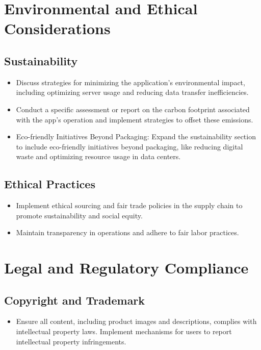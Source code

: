 \documentclass[11pt]{article}
\begin{document}
	\section*{Environmental and Ethical Considerations}
	
	\subsection*{Sustainability}
	\begin{itemize}
		\item Discuss strategies for minimizing the application's environmental impact, including optimizing server usage and reducing data transfer inefficiencies.
		\item Conduct a specific assessment or report on the carbon footprint associated with the app's operation and implement strategies to offset these emissions.
		\item Eco-friendly Initiatives Beyond Packaging: Expand the sustainability section to include eco-friendly initiatives beyond packaging, like reducing digital waste and optimizing resource usage in data centers.
	\end{itemize}
	
	\subsection*{Ethical Practices}
	\begin{itemize}
		\item Implement ethical sourcing and fair trade policies in the supply chain to promote sustainability and social equity.
		\item Maintain transparency in operations and adhere to fair labor practices.
	\end{itemize}
	
	\section*{Legal and Regulatory Compliance}
	
	\subsection*{Copyright and Trademark}
	\begin{itemize}
		\item Ensure all content, including product images and descriptions, complies with intellectual property laws. Implement mechanisms for users to report intellectual property infringements.
	\end{itemize}
	
\end{document}
